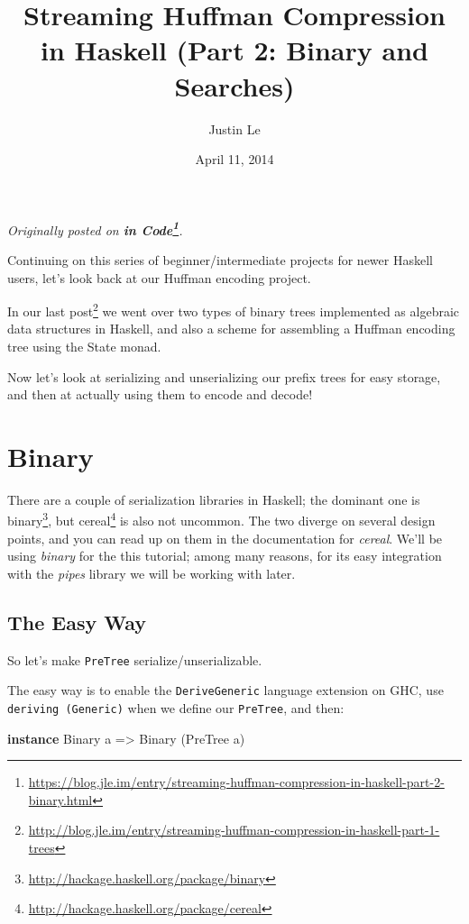 \documentclass[]{article}
\title{Streaming Huffman Compression in Haskell (Part 2: Binary and Searches)}
\author{Justin Le}
\date{April 11, 2014}
\newenvironment{Shaded}{\begin{snugshade}}{\end{snugshade}}
\newcommand{\DataTypeTok}[1]{\textcolor[rgb]{0.13,0.29,0.53}{#1}}
\newcommand{\KeywordTok}[1]{\textcolor[rgb]{0.13,0.29,0.53}{\textbf{#1}}}
\newcommand{\NormalTok}[1]{#1}
\newcommand{\OtherTok}[1]{\textcolor[rgb]{0.56,0.35,0.01}{#1}}
\renewcommand{\href}[2]{#2\footnote{\url{#1}}}
\begin{document}
\maketitle

\emph{Originally posted on
\textbf{\href{https://blog.jle.im/entry/streaming-huffman-compression-in-haskell-part-2-binary.html}{in
Code}}.}

Continuing on this series of beginner/intermediate projects for newer Haskell
users, let's look back at our Huffman encoding project.

In our
\href{http://blog.jle.im/entry/streaming-huffman-compression-in-haskell-part-1-trees}{last
post} we went over two types of binary trees implemented as algebraic data
structures in Haskell, and also a scheme for assembling a Huffman encoding tree
using the State monad.

Now let's look at serializing and unserializing our prefix trees for easy
storage, and then at actually using them to encode and decode!

\hypertarget{binary}{%
\section{Binary}\label{binary}}

There are a couple of serialization libraries in Haskell; the dominant one is
\href{http://hackage.haskell.org/package/binary}{binary}, but
\href{http://hackage.haskell.org/package/cereal}{cereal} is also not uncommon.
The two diverge on several design points, and you can read up on them in the
documentation for \emph{cereal}. We'll be using \emph{binary} for the this
tutorial; among many reasons, for its easy integration with the \emph{pipes}
library we will be working with later.

\hypertarget{the-easy-way}{%
\subsection{The Easy Way}\label{the-easy-way}}

So let's make \texttt{PreTree} serialize/unserializable.

The easy way is to enable the \texttt{DeriveGeneric} language extension on GHC,
use \texttt{deriving\ (Generic)} when we define our \texttt{PreTree}, and then:

\begin{Shaded}
\begin{Highlighting}[]
\KeywordTok{instance} \DataTypeTok{Binary}\NormalTok{ a }\OtherTok{=>} \DataTypeTok{Binary}\NormalTok{ (}\DataTypeTok{PreTree}\NormalTok{ a)}
\end{Highlighting}
\end{Shaded}
\end{document}
